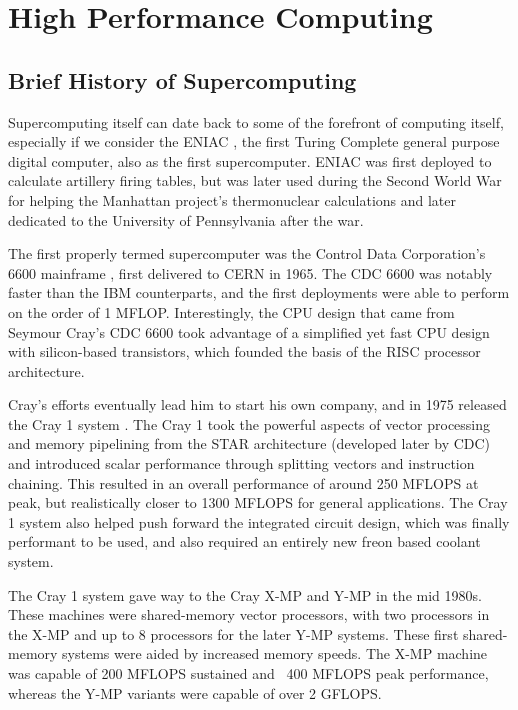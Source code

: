 \section{High Performance Computing}
\label{sec:hpc}


\subsection{Brief History of Supercomputing}

Supercomputing itself can date back to some of the forefront of computing itself, especially if we consider the ENIAC \cite{goldstine1946electronic}, the first Turing Complete general purpose digital computer, also as the first supercomputer.  ENIAC was first deployed to calculate artillery firing tables, but was later used during the Second World War for helping the Manhattan project's thermonuclear calculations and later dedicated to the University of Pennsylvania after the war. 

The first properly termed supercomputer was the Control Data Corporation's  6600 mainframe \cite{thornton1970design}, first delivered to CERN in 1965. The CDC 6600 was notably faster than the IBM counterparts, and the first deployments were able to perform on the order of 1 MFLOP. Interestingly, the CPU design that came from Seymour Cray's  CDC 6600 took advantage of a simplified yet fast CPU design with silicon-based transistors, which founded the basis of the RISC processor architecture. 


Cray's efforts eventually lead him to start his own company, and in 1975 released the Cray 1 system \cite{russell1978cray}. The Cray 1 took the powerful aspects of vector processing and memory pipelining from the STAR architecture (developed later by CDC) and introduced scalar performance through splitting vectors and instruction chaining. This resulted in an overall performance of around 250 MFLOPS at peak, but realistically closer to 1300 MFLOPS for general applications.  The Cray 1 system also helped push forward the integrated circuit design, which was finally performant to be used, and also required an entirely new freon based coolant system.

The Cray 1 system gave way to the Cray X-MP and Y-MP in the mid 1980s. These machines were shared-memory vector processors, with two processors in the X-MP and up to 8 processors for the later Y-MP systems. These first shared-memory systems were aided by increased memory speeds. The X-MP machine was capable of 200 MFLOPS sustained and ~400 MFLOPS peak performance, whereas the Y-MP variants were capable of over 2 GFLOPS. 

